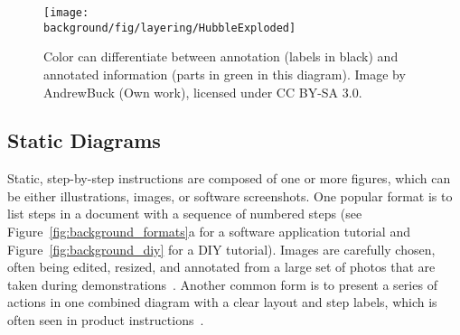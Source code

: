 \begin{figure*}[th!]
  \centering
  \texttt{[image: \\background/fig/layering/HubbleExploded]}
  \caption{Color can differentiate between annotation (labels in black) and annotated information (parts in green in this diagram). Image by AndrewBuck (Own work), licensed under CC BY-SA 3.0.
  }
  \label{fig:background_HubbleExploded}
\end{figure*}




\subsection{Static Diagrams}

Static, step-by-step instructions are composed of one or more figures, which can be either illustrations, images, or software screenshots. One popular format is to list steps in a document with a sequence of numbered steps (see Figure~\ref{fig:background_formats}a for a software application tutorial and Figure~\ref{fig:background_diy} for a DIY tutorial). Images are carefully chosen, often being edited, resized, and annotated from a large set of photos that are taken during demonstrations~\cite{Tseng:2014:PVP:2598510.2598540}.
%
Another common form is to present a series of actions in one combined diagram with a clear layout and step labels, which is often seen in product instructions~\cite{mijksenaar1999open}.

